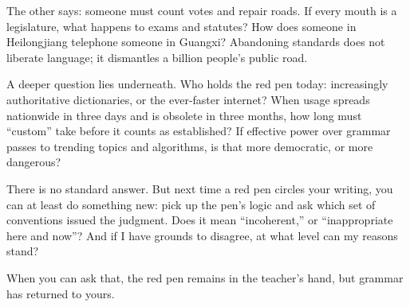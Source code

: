 The other says: someone must count votes and repair roads. If every mouth is a legislature, what happens to exams and statutes? How does someone in Heilongjiang telephone someone in Guangxi? Abandoning standards does not liberate language; it dismantles a billion people's public road.

A deeper question lies underneath. Who holds the red pen today: increasingly authoritative dictionaries, or the ever-faster internet? When usage spreads nationwide in three days and is obsolete in three months, how long must ``custom'' take before it counts as established? If effective power over grammar passes to trending topics and algorithms, is that more democratic, or more dangerous?

There is no standard answer. But next time a red pen circles your writing, you can at least do something new: pick up the pen's logic and ask which set of conventions issued the judgment. Does it mean ``incoherent,'' or ``inappropriate here and now''? And if I have grounds to disagree, at what level can my reasons stand?

When you can ask that, the red pen remains in the teacher's hand, but grammar has returned to yours.
